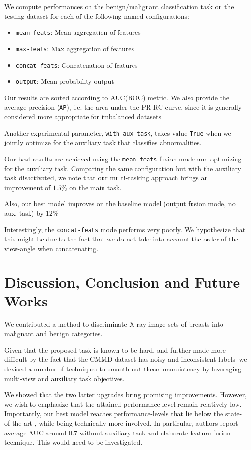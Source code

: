 \documentclass[11pt]{article}
\begin{document}
We compute performances on the benign/malignant classification task
on the testing dataset for each of the following named configurations:

\begin{itemize}
\item \texttt{mean-feats}: Mean aggregation of features
\item \texttt{max-feats}: Max aggregation of features
\item \texttt{concat-feats}: Concatenation of features
\item \texttt{output}: Mean probability output
\end{itemize}

Our results are sorted according to AUC(ROC) metric.
We also provide the average precision (\texttt{AP}), i.e. the area under the PR-RC curve, since
it is generally considered more appropriate for imbalanced datasets.

Another experimental parameter, \texttt{with aux task}, takes value \texttt{True} when we jointly optimize for the
auxiliary task that classifies abnormalities.

Our best results are achieved using the \texttt{mean-feats} fusion mode and
optimizing for the auxiliary task.
Comparing the same configuration but with the auxiliary task disactivated,
we note that our multi-tasking approach brings an improvement of \(1.5\%\) on the main task.

Also, our best model improves on the baseline model
(output fusion mode, no aux. task) by \(12\%\).

Interestingly, the \texttt{concat-feats} mode performs very poorly.
We hypothesize that this might be due to the fact
that we do not take into account the order of the view-angle when
concatenating.
\section{Discussion, Conclusion and Future Works}
\label{sec:orgaa07e83}

We contributed a method to discriminate X-ray image sets of breasts into malignant and benign
categories.

Given that the proposed task is known to be hard, and further made more difficult by
the fact that the CMMD dataset has noisy and inconsistent labels,
we devised a number of techniques to smooth-out these inconsistency by
leveraging multi-view and auxiliary task objectives.

We showed that the two latter upgrades bring promising improvements.
However, we wish to emphasize that the attained performance-level remain relatively low.
Importantly, our best model reaches performance-levels that lie
below the state-of-the-art \autocite{tardy22}, while being technically more involved.
In particular, authors report average AUC around \(0.7\) without auxiliary task
and elaborate feature fusion technique. This would need to be investigated.
\end{document}
